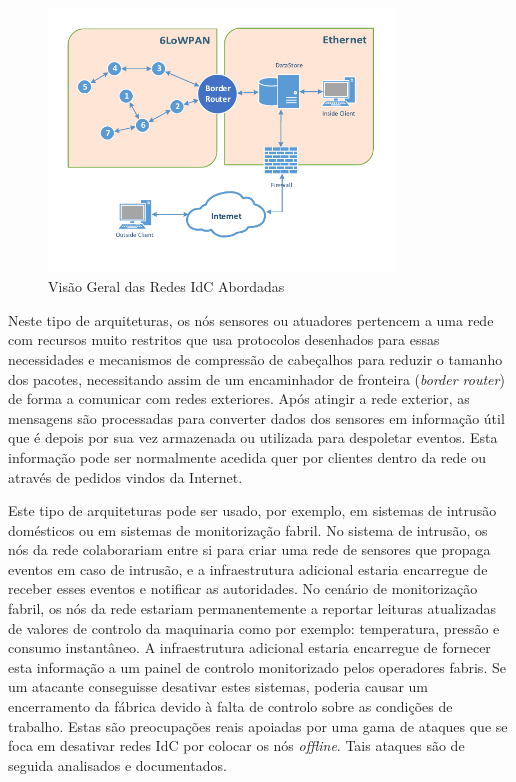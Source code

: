 \documentclass{llncs}
\begin{document}
\begin{figure}
  \centering
  \includegraphics[height=7cm,keepaspectratio]{figures/Network_Overview.pdf}
  \caption{Visão Geral das Redes IdC Abordadas}
  \label{fig:net_overview}
\end{figure}

Neste tipo de arquiteturas, os nós sensores ou atuadores pertencem a uma rede com recursos muito restritos que usa protocolos desenhados para essas necessidades e mecanismos de compressão de cabeçalhos para reduzir o tamanho dos pacotes, necessitando assim de um encaminhador de fronteira (\textit{border router}) de forma a comunicar com redes exteriores. Após atingir a rede exterior, as mensagens são processadas para converter dados dos sensores em informação útil que é depois por sua vez armazenada ou utilizada para despoletar eventos. Esta informação pode ser normalmente acedida quer por clientes dentro da rede ou através de pedidos vindos da Internet.

Este tipo de arquiteturas pode ser usado, por exemplo, em sistemas de intrusão domésticos ou em sistemas de monitorização fabril. 
No sistema de intrusão, os nós da rede colaborariam entre si para criar uma rede de sensores que propaga eventos em caso de intrusão, e a infraestrutura adicional estaria encarregue de receber esses eventos e notificar as autoridades. 
No cenário de monitorização fabril, os nós da rede estariam permanentemente a reportar leituras atualizadas de valores de controlo da maquinaria como por exemplo: temperatura, pressão e consumo instantâneo. 
A infraestrutura adicional estaria encarregue de fornecer esta informação a um painel de controlo monitorizado pelos operadores fabris. 
Se um atacante conseguisse desativar estes sistemas, poderia causar um encerramento da fábrica devido à falta de controlo sobre as condições de trabalho. 
Estas são preocupações reais apoiadas por uma gama de ataques que se foca em desativar redes \ac{IdC} por colocar os nós \textit{offline}. 
Tais ataques são de seguida analisados e documentados.
\end{document}
